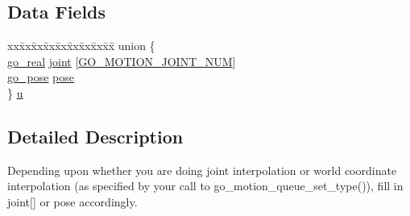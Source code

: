 \subsection*{Data Fields}
\begin{DoxyCompactItemize}
\item 
\begin{tabbing}
xx\=xx\=xx\=xx\=xx\=xx\=xx\=xx\=xx\=\kill
union \{\\
\>\hyperlink{gotypes_8h_afd666a2393eebd71ee455846ac9def9b}{go\_real} \hyperlink{structgomotion_1_1go__position_abe054c50898120fd6b1b260edf8f0074}{joint} \mbox{[}\hyperlink{gomotion_8h_ac7b4e696e30d95d9a3d178233eabed55}{GO\_MOTION\_JOINT\_NUM}\mbox{]}\\
\>\hyperlink{structgomotion_1_1go__pose}{go\_pose} \hyperlink{structgomotion_1_1go__position_a52e09e22901615c1ca71757ea57215ca}{pose}\\
\} \hyperlink{structgomotion_1_1go__position_a9c36a514458a3a87eb49cbf1df68ed21}{u}\\

\end{tabbing}\end{DoxyCompactItemize}


\subsection{Detailed Description}
Depending upon whether you are doing joint interpolation or world coordinate interpolation (as specified by your call to go\-\_\-motion\-\_\-queue\-\_\-set\-\_\-type()), fill in joint\mbox{[}\mbox{]} or pose accordingly. 

